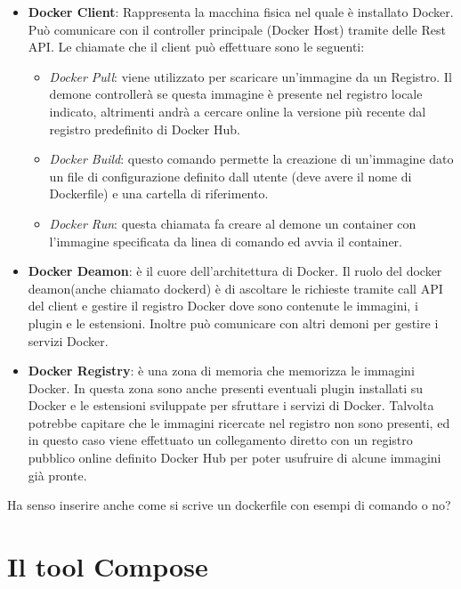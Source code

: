 \begin{itemize}
    \item \textbf{Docker Client}: Rappresenta la macchina fisica nel quale è installato Docker. Può comunicare con il controller principale (Docker Host) tramite delle Rest API.
    Le chiamate che il client può effettuare sono le seguenti:
        \begin{itemize}
            \item \textit{Docker Pull}: viene utilizzato per scaricare un'immagine da un Registro. Il demone controllerà se questa immagine è presente nel registro locale indicato, altrimenti andrà a cercare online
                la versione più recente dal registro predefinito di Docker Hub.
            \item \textit{Docker Build}: questo comando permette la creazione di un'immagine dato un file di configurazione definito dall utente (deve avere il nome di Dockerfile) e una cartella di riferimento.
            \item \textit{Docker Run}: questa chiamata fa creare al demone un container con l'immagine specificata da linea di comando ed avvia il container.
        \end{itemize}
    \item \textbf{Docker Deamon}: è il cuore dell'architettura di Docker. Il ruolo del docker deamon(anche chiamato dockerd) è di ascoltare le richieste tramite call API del client e gestire il registro Docker dove sono contenute
        le immagini, i plugin e le estensioni. Inoltre può comunicare con altri demoni per gestire i servizi Docker.
    \item \textbf{Docker Registry}: è  una zona di memoria che memorizza le immagini Docker. In questa zona sono anche presenti eventuali plugin installati su Docker e le estensioni sviluppate per sfruttare i servizi di Docker.
        Talvolta potrebbe capitare che le immagini ricercate nel registro non sono presenti, ed in questo caso viene effettuato un collegamento diretto con un registro pubblico online definito Docker Hub per poter usufruire di alcune
        immagini già pronte.
\end{itemize}


Ha senso inserire anche come si scrive un dockerfile con esempi di comando o no?

\section{Il tool Compose}

